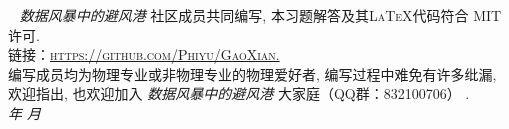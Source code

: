 \documentclass[11pt,a4paper]{ctexbook}
\title{\huge \heiti{高显经典力学习题解答}}
\author{ \ttfamily \texttt \Large 数据风暴中的避风港\\}
\date{\large \today}
\begin{document}
\maketitle

\pagestyle{fancy}
\fancyhf{}
\fancyhead{}
~\vfill
\noindent \textit{数据风暴中的避风港 }\textsc{ 社区成员共同编写, 本习题解答及其\LaTeX 代码符合 MIT 许可.}\\

\noindent \textsc{链接：\url{https://github.com/Phiyu/GaoXian.}}\\

\noindent \textsc{编写成员均为物理专业或非物理专业的物理爱好者, 编写过程中难免有许多纰漏, 欢迎指出, 也欢迎加入}
\textit{ 数据风暴中的避风港 } 
\textsc{大家庭（QQ群：832100706） .}\\

\noindent \textit{\number\year 年 \number\month 月} %

\tableofcontents

\newpage
\pagestyle{fancy}
\fancyhf{} 
\fancyhead[LE]{\kaishu \leftmark}
\fancyhead[RO]{\kaishu \leftmark}
\cfoot{\thepage}

\setcounter{page}{1}

\setcounter{problem}{0}
\newpage


\setcounter{problem}{0}
\newpage 


\newpage


\newpage 


\newpage


\newpage 


\newpage


\newpage 


\newpage


\newpage 


\newpage


\newpage 


\newpage


\newpage 


\newpage


\newpage 


\newpage

\end{document}
